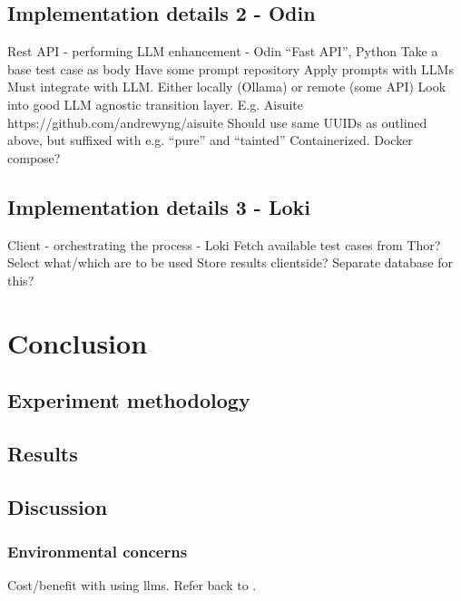 \documentclass[UKenglish]{uiomasterthesis}  %
\begin{document}
\chapter{Implementation details 2 - Odin}

Rest API - performing LLM enhancement - Odin
“Fast API”, Python
Take a base test case as body
Have some prompt repository
Apply prompts with LLMs
Must integrate with LLM. Either locally (Ollama) or remote (some API)
Look into good LLM agnostic transition layer. E.g. Aisuite
https://github.com/andrewyng/aisuite
Should use same UUIDs as outlined above, but suffixed with e.g. “pure” and “tainted”
Containerized. Docker compose?

\chapter{Implementation details 3 - Loki}

Client - orchestrating the process - Loki
Fetch available test cases from Thor? Select what/which are to be used
Store results clientside? Separate database for this?

\part{Conclusion}
\chapter{Experiment methodology}
\chapter{Results}
\chapter{Discussion}
\section{Environmental concerns}
Cost/benefit with using \acrshort{llms}. Refer back to .



\backmatter{}
\printbibliography{}
\end{document}
